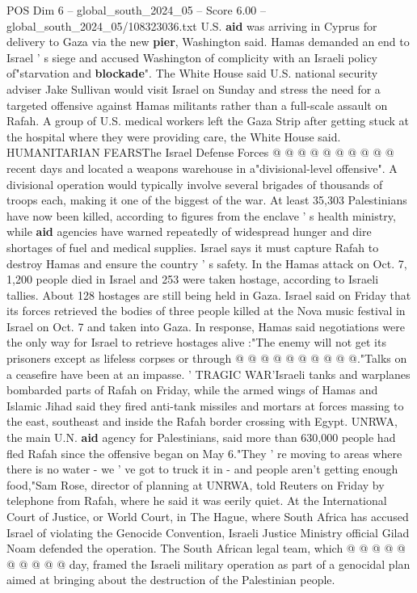 \begin{textsample}{POS Dim 6 – global\_south\_2024\_05 – Score 6.00 – global\_south\_2024\_05/108323036.txt}
U.S. \textbf{aid} was arriving in Cyprus for delivery to Gaza via the new \textbf{pier}, Washington said.
Hamas demanded an end to Israel ' s siege and accused Washington of complicity with an Israeli policy of"starvation and \textbf{blockade}".
The White House said U.S. national security adviser Jake Sullivan would visit Israel on Sunday and stress the need for a targeted offensive against Hamas militants rather than a full-scale assault on Rafah.
A group of U.S. medical workers left the Gaza Strip after getting stuck at the hospital where they were providing care, the White House said.
HUMANITARIAN FEARSThe Israel Defense Forces @ @ @ @ @ @ @ @ @ @ recent days and located a weapons warehouse in a"divisional-level offensive".
A divisional operation would typically involve several brigades of thousands of troops each, making it one of the biggest of the war.
At least 35,303 Palestinians have now been killed, according to figures from the enclave ' s health ministry, while \textbf{aid} agencies have warned repeatedly of widespread hunger and dire shortages of fuel and medical supplies.
Israel says it must capture Rafah to destroy Hamas and ensure the country ' s safety.
In the Hamas attack on Oct. 7, 1,200 people died in Israel and 253 were taken hostage, according to Israeli tallies.
About 128 hostages are still being held in Gaza.
Israel said on Friday that its forces retrieved the bodies of three people killed at the Nova music festival in Israel on Oct. 7 and taken into Gaza.
In response, Hamas said negotiations were the only way for Israel to retrieve hostages alive :"The enemy will not get its prisoners except as lifeless corpses or through @ @ @ @ @ @ @ @ @ @."Talks on a ceasefire have been at an impasse. ' TRAGIC WAR'Israeli tanks and warplanes bombarded parts of Rafah on Friday, while the armed wings of Hamas and Islamic Jihad said they fired anti-tank missiles and mortars at forces massing to the east, southeast and inside the Rafah border crossing with Egypt.
UNRWA, the main U.N. \textbf{aid} agency for Palestinians, said more than 630,000 people had fled Rafah since the offensive began on May 6."They ' re moving to areas where there is no water - we ' ve got to truck it in - and people aren't getting enough food,"Sam Rose, director of planning at UNRWA, told Reuters on Friday by telephone from Rafah, where he said it was eerily quiet.
At the International Court of Justice, or World Court, in The Hague, where South Africa has accused Israel of violating the Genocide Convention, Israeli Justice Ministry official Gilad Noam defended the operation.
The South African legal team, which @ @ @ @ @ @ @ @ @ @ day, framed the Israeli military operation as part of a genocidal plan aimed at bringing about the destruction of the Palestinian people.

\end{textsample}
